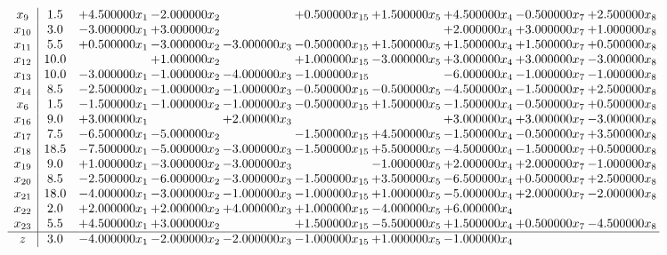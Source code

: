 \documentclass[10pt]{article}
\begin{document}
 \[\begin{array}{c| c c@{\hskip 2pt} c@{\hskip 2pt} c@{\hskip 2pt} c@{\hskip 2pt} c@{\hskip 2pt} c@{\hskip 2pt} c@{\hskip 2pt} c@{\hskip 2pt} }
 x_{9}   &  1.5 & + 4.500000 x_{1} & -2.000000 x_{2} &   & + 0.500000 x_{15} & + 1.500000 x_{5} & + 4.500000 x_{4} & -0.500000 x_{7} & + 2.500000 x_{8}\\
 x_{10}   &  3.0 & -3.000000 x_{1} & + 3.000000 x_{2} &    &    &   & + 2.000000 x_{4} & + 3.000000 x_{7} & + 1.000000 x_{8}\\
 x_{11}   &  5.5 & + 0.500000 x_{1} & -3.000000 x_{2} & -3.000000 x_{3} & -0.500000 x_{15} & + 1.500000 x_{5} & + 1.500000 x_{4} & + 1.500000 x_{7} & + 0.500000 x_{8}\\
 x_{12}   &  10.0  &   & + 1.000000 x_{2} &   & + 1.000000 x_{15} & -3.000000 x_{5} & + 3.000000 x_{4} & + 3.000000 x_{7} & -3.000000 x_{8}\\
 x_{13}   &  10.0 & -3.000000 x_{1} & -1.000000 x_{2} & -4.000000 x_{3} & -1.000000 x_{15} &   & -6.000000 x_{4} & -1.000000 x_{7} & -1.000000 x_{8}\\
 x_{14}   &  8.5 & -2.500000 x_{1} & -1.000000 x_{2} & -1.000000 x_{3} & -0.500000 x_{15} & -0.500000 x_{5} & -4.500000 x_{4} & -1.500000 x_{7} & + 2.500000 x_{8}\\
 x_{6}   &  1.5 & -1.500000 x_{1} & -1.000000 x_{2} & -1.000000 x_{3} & -0.500000 x_{15} & + 1.500000 x_{5} & -1.500000 x_{4} & -0.500000 x_{7} & + 0.500000 x_{8}\\
 x_{16}   &  9.0 & + 3.000000 x_{1} &   & + 2.000000 x_{3} &    &   & + 3.000000 x_{4} & + 3.000000 x_{7} & -3.000000 x_{8}\\
 x_{17}   &  7.5 & -6.500000 x_{1} & -5.000000 x_{2} &   & -1.500000 x_{15} & + 4.500000 x_{5} & -1.500000 x_{4} & -0.500000 x_{7} & + 3.500000 x_{8}\\
 x_{18}   &  18.5 & -7.500000 x_{1} & -5.000000 x_{2} & -3.000000 x_{3} & -1.500000 x_{15} & + 5.500000 x_{5} & -4.500000 x_{4} & -1.500000 x_{7} & + 0.500000 x_{8}\\
 x_{19}   &  9.0 & + 1.000000 x_{1} & -3.000000 x_{2} & -3.000000 x_{3} &   & -1.000000 x_{5} & + 2.000000 x_{4} & + 2.000000 x_{7} & -1.000000 x_{8}\\
 x_{20}   &  8.5 & -2.500000 x_{1} & -6.000000 x_{2} & -3.000000 x_{3} & -1.500000 x_{15} & + 3.500000 x_{5} & -6.500000 x_{4} & + 0.500000 x_{7} & + 2.500000 x_{8}\\
 x_{21}   &  18.0 & -4.000000 x_{1} & -3.000000 x_{2} & -1.000000 x_{3} & -1.000000 x_{15} & + 1.000000 x_{5} & -5.000000 x_{4} & + 2.000000 x_{7} & -2.000000 x_{8}\\
 x_{22}   &  2.0 & + 2.000000 x_{1} & + 2.000000 x_{2} & + 4.000000 x_{3} & + 1.000000 x_{15} & -4.000000 x_{5} & + 6.000000 x_{4} &    &   \\
 x_{23}   &  5.5 & + 4.500000 x_{1} & + 3.000000 x_{2} &   & + 1.500000 x_{15} & -5.500000 x_{5} & + 1.500000 x_{4} & + 0.500000 x_{7} & -4.500000 x_{8}\\
\hline
z    &  3.0 & -4.000000 x_{1} & -2.000000 x_{2} & -2.000000 x_{3} & -1.000000 x_{15} & + 1.000000 x_{5} & -1.000000 x_{4} &    &   \\
\end{array}\]
\end{document}
